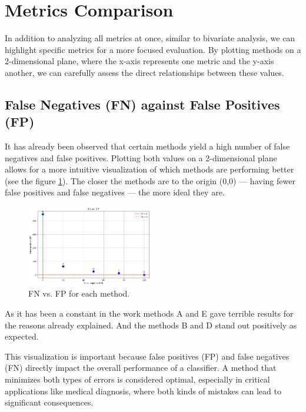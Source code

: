 \documentclass{llncs}
\begin{document}
 \section{Metrics Comparison}
 
 In addition to analyzing all metrics at once, similar to bivariate analysis, we can highlight specific metrics for a more focused evaluation. By plotting methods on a 2-dimensional plane, where the x-axis represents one metric and the y-axis another, we can carefully assess the direct relationships between these values.
 
 \subsection{False Negatives (FN) against False Positives (FP)}
 
 It has already been observed that certain methods yield a high number of false negatives and false positives. Plotting both values on a 2-dimensional plane allows for a more intuitive visualization of which methods are performing better (see the figure \ref{fig:FPyFN}). The closer the methods are to the origin (0,0) — having fewer false positives and false negatives — the more ideal they are.

\begin{figure}[h!]
	\begin{center}  %
		\includegraphics[width=0.49\textwidth]{images/FN_VS_FP.png}
		\caption{FN vs. FP for each method.}
		\label{fig:FPyFN}
	\end{center}
\end{figure}

As it has been a constant in the work methods A and E gave terrible results for the reasons already explained. And the methods B and D stand out positively as expected. 

This visualization is important because false positives (FP) and false negatives (FN) directly impact the overall performance of a classifier. A method that minimizes both types of errors is considered optimal, especially in critical applications like medical diagnosis, where both kinds of mistakes can lead to significant consequences.
\end{document}
